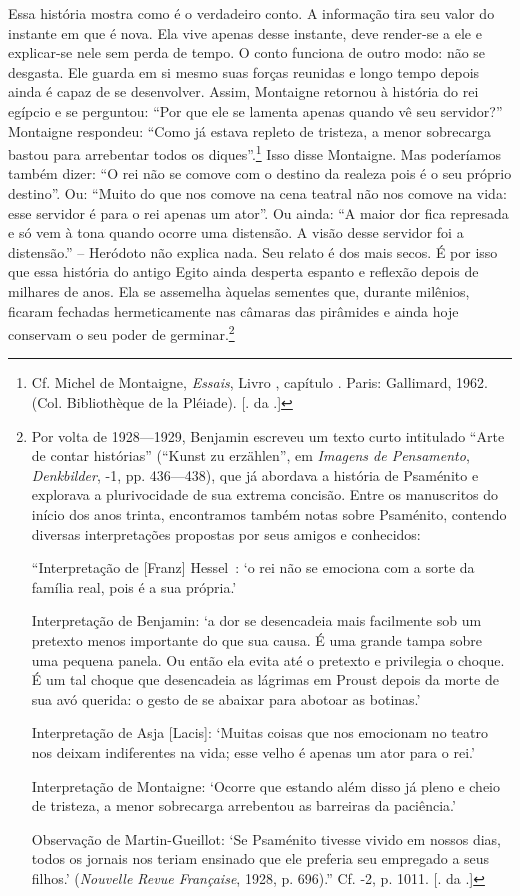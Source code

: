 Essa história mostra como é o verdadeiro conto. A informação tira seu
valor do instante em que é nova. Ela vive apenas desse instante, deve
render-se a ele e explicar-se nele sem perda de tempo. O conto funciona
de outro modo: não se desgasta. Ele guarda em si mesmo suas forças
reunidas e longo tempo depois ainda é capaz de se desenvolver. Assim,
Montaigne retornou à história do rei egípcio e se perguntou: ``Por que ele
se lamenta apenas quando vê seu servidor?'' Montaigne respondeu: ``Como já
estava repleto de tristeza, a menor sobrecarga bastou para arrebentar
todos os diques''.\footnote{Cf. Michel de Montaigne, \emph{Essais},
  Livro , capítulo . Paris: Gallimard, 1962. (Col. Bibliothèque de la
  Pléiade). [. da .]} Isso disse Montaigne. Mas poderíamos também
dizer: ``O rei não se comove com o destino da realeza pois é o seu
próprio destino''. Ou: ``Muito do que nos comove na cena teatral não nos
comove na vida: esse servidor é para o rei apenas um ator''. Ou ainda:
``A maior dor fica represada e só vem à tona quando ocorre uma
distensão. A visão desse servidor foi a distensão.'' -- Heródoto não
explica nada. Seu relato é dos mais secos. É por isso que essa história
do antigo Egito ainda desperta espanto e reflexão depois de milhares de
anos. Ela se assemelha àquelas sementes que, durante milênios, ficaram
fechadas hermeticamente nas câmaras das pirâmides e ainda hoje conservam
o seu poder de germinar.\footnote{Por volta de 1928---1929, Benjamin
  escreveu um texto curto intitulado ``Arte de contar histórias''
  (``Kunst zu erzählen'', em \emph{Imagens de Pensamento},
  \emph{Denkbilder},  -1, pp. 436---438), que já abordava a história
  de Psaménito e explorava a plurivocidade de sua extrema concisão.
  Entre os manuscritos do início dos anos trinta, encontramos também
  notas sobre Psaménito, contendo diversas interpretações propostas por
  seus amigos e conhecidos:

  ``Interpretação de [Franz] Hessel~: `o rei não se emociona com a
  sorte da família real, pois é a sua própria.'

  Interpretação de Benjamin: `a dor se desencadeia mais facilmente sob
  um pretexto menos importante do que sua causa. É uma grande tampa
  sobre uma pequena panela. Ou então ela evita até o pretexto e
  privilegia o choque. É um tal choque que desencadeia as lágrimas em
  Proust depois da morte de sua avó querida: o gesto de se abaixar para
  abotoar as botinas.'

  Interpretação de Asja [Lacis]: `Muitas coisas que nos emocionam no
  teatro nos deixam indiferentes na vida; esse velho é apenas um ator
  para o rei.'

  Interpretação de Montaigne: `Ocorre que estando além disso já pleno e
  cheio de tristeza, a menor sobrecarga arrebentou as barreiras da
  paciência.'

  Observação de Martin-Gueillot: `Se Psaménito tivesse vivido em nossos
  dias, todos os jornais nos teriam ensinado que ele preferia seu
  empregado a seus filhos.' (\emph{Nouvelle Revue Française}, 1928, p.
  696).'' Cf.  -2, p. 1011. [. da .]}

